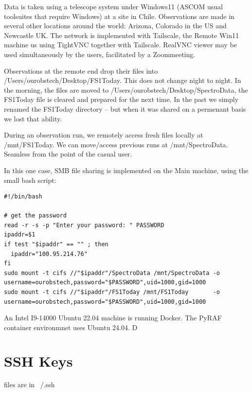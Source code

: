 \documentclass[letter,11pt,oneside]{article}
\begin{document}
Data is taken using a telescope system under Windows11 (ASCOM usual toolsuites
that require Windows) at a site in Chile. Observations are made in several other
locations around the world: Arizona, Colorado in the US and Newcastle UK. The
network is implemented with Tailscale, the Remote Win11 machine us using TightVNC
together with Tailscale. RealVNC viewer may be used simultaneously by the users,
facilitated by a Zoom\texttrademark meeting.

Observations at the remote end drop their files into /Users/ourobstech/Desktop/FS1Today.
This does not change night to night. In the morning, the files are moved to
/Users/ourobstech/Desktop/SpectroData, the FS1Today file is cleared and prepared
for the next time. In the past we simply renamed the FS1Today directory -- but when
it was shared on a permenant basis we lost that ability. 

During an observation run, we remotely access fresh files locally at /mnt/FS1Today.
We can move/access previous runs at /mnt/SpectroData. Seamless from the point of
the casual user.

In this one case, SMB file sharing is implemented on the Main machine, using the
small bash script:

\begingroup \fontsize{8pt}{8pt}
\selectfont
\begin{verbatim} 
#!/bin/bash

# get the password
read -r -s -p "Enter your password: " PASSWORD
ipaddr=$1
if test "$ipaddr" == "" ; then 
  ipaddr="100.95.214.76"
fi
sudo mount -t cifs //"$ipaddr"/SpectroData /mnt/SpectroData -o username=ourobstech,password="$PASSWORD",uid=1000,gid=1000
sudo mount -t cifs //"$ipaddr"/FS1Today /mnt/FS1Today       -o username=ourobstech,password="$PASSWORD",uid=1000,gid=1000
\end{verbatim}
\endgroup


An Intel I9-14000 Ubuntu 22.04 machine is running Docker. The PyRAF container
environmnet uses Ubuntu 24.04. D

\appendix
\renewcommand \thesection{\Alph{section}}

\section{SSH Keys}

files are in ~/.ssh
\end{document}
